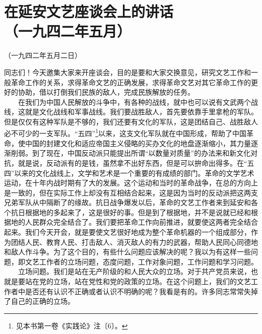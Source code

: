 \documentclass[cn,11pt,chinese]{elegantbook}
\def\myformat#1{\hfil\hfil #1}
\begin{document}
\newpage\section*{\myformat{在延安文艺座谈会上的讲话}\\\myformat{（一九四二年五月）}}
\begin{introduction}\item （一九四二年五月二日）\end{introduction}
同志们！今天邀集大家来开座谈会，目的是要和大家交换意见，研究文艺工作和一般革命工作的关系，求得革命文艺的正确发展，求得革命文艺对其它革命工作的更好的协助，借以打倒我们民族的敌人，完成民族解放的任务。\\
　　在我们为中国人民解放的斗争中，有各种的战线，就中也可以说有文武两个战线，这就是文化战线和军事战线。我们要战胜敌人，首先要依靠手里拿枪的军队。但是仅仅有这种军队是不够的，我们还要有文化的军队，这是团结自己、战胜敌人必不可少的一支军队。“五四”\footnote[1]{ 见本书第一卷《实践论》注〔6〕。}以来，这支文化军队就在中国形成，帮助了中国革命，使中国的封建文化和适应帝国主义侵略的买办文化的地盘逐渐缩小，其力量逐渐削弱。到了现在，中国反动派只能提出所谓“以数量对质量”的办法来和新文化对抗，就是说，反动派有的是钱，虽然拿不出好东西，但是可以拚命出得多。在“五四”以来的文化战线上，文学和艺术是一个重要的有成绩的部门。革命的文学艺术运动，在十年内战时期有了大的发展。这个运动和当时的革命战争，在总的方向上是一致的，但在实际工作上却没有互相结合起来，这是因为当时的反动派把这两支兄弟军队从中隔断了的缘故。抗日战争爆发以后，革命的文艺工作者来到延安和各个抗日根据地的多起来了，这是很好的事。但是到了根据地，并不是说就已经和根据地的人民群众完全结合了。我们要把革命工作向前推进，就要使这两者完全结合起来。我们今天开会，就是要使文艺很好地成为整个革命机器的一个组成部分，作为团结人民、教育人民、打击敌人、消灭敌人的有力的武器，帮助人民同心同德地和敌人作斗争。为了这个目的，有些什么问题应该解决的呢？我以为有这样一些问题，即文艺工作者的立场问题，态度问题，工作对象问题，工作问题和学习问题。\\
　　立场问题。我们是站在无产阶级的和人民大众的立场。对于共产党员来说，也就是要站在党的立场，站在党性和党的政策的立场。在这个问题上，我们的文艺工作者中是否还有认识不正确或者认识不明确的呢？我看是有的。许多同志常常失掉了自己的正确的立场。\\
\end{document}

